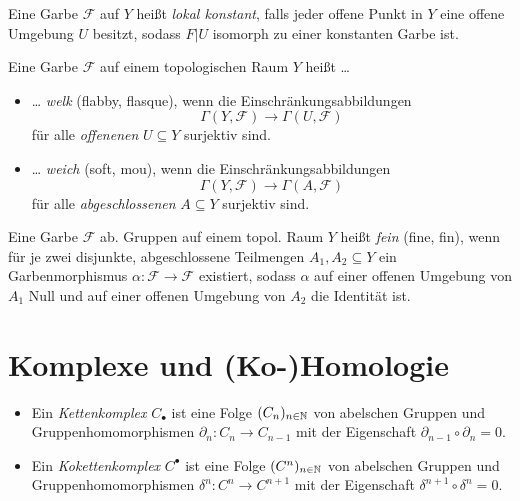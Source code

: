 \documentclass{cheat-sheet}
\newcommand{\CC}[1]{{#1}_{\bullet}} %
\newcommand{\CCC}[1]{{#1}^{\bullet}} %
\newcommand{\Fais}{\mathcal{F}} %
\begin{document}
\begin{samepage}

\begin{defn}
  Eine Garbe $\Fais$ auf $Y$ heißt \emph{lokal konstant}, falls jeder offene Punkt in $Y$ eine offene Umgebung $U$ besitzt, sodass $F|U$ isomorph zu einer konstanten Garbe ist.
\end{defn}

\begin{defn}
   Eine Garbe $\Fais$ auf einem topologischen Raum $Y$ heißt \ldots{}
  \begin{itemize}
    \item \ldots{} \emph{welk} (flabby, flasque), wenn die Einschränkungsabbildungen
    \[ \Gamma(Y, \Fais) \to \Gamma(U, \Fais) \]
    für alle {\em offenenen} $U \subseteq Y$ surjektiv sind.
    \item \ldots{} \emph{weich} (soft, mou), wenn die Einschränkungsabbildungen
    \[ \Gamma(Y, \Fais) \to \Gamma(A, \Fais) \]
    für alle {\em abgeschlossenen} $A \subseteq Y$ surjektiv sind.
  \end{itemize}
\end{defn}

\begin{defn}
   Eine Garbe $\Fais$ ab. Gruppen auf einem topol. Raum $Y$ heißt \emph{fein} (fine, fin), wenn für je zwei disjunkte, abgeschlossene Teilmengen $A_1, A_2 \subseteq Y$ ein Garbenmorphismus $\alpha : \Fais \to \Fais$ existiert, sodass $\alpha$ auf einer offenen Umgebung von $A_1$ Null und auf einer offenen Umgebung von $A_2$ die Identität ist.
\end{defn}

\section{Komplexe und (Ko-)Homologie}

\end{samepage}


\begin{defn}
  \begin{itemize}
    \item Ein \emph{Kettenkomplex} $\CC{C}$ ist eine Folge $(C_n)_{n \in \mathbb{N}}$ von abelschen Gruppen und Gruppenhomomorphismen $\partial_n : C_n \to C_{n-1}$ mit der Eigenschaft $\partial_{n-1} \circ \partial_n = 0$.
    \item Ein \emph{Kokettenkomplex} $\CCC{C}$ ist eine Folge $(C^n)_{n \in \mathbb{N}}$ von abelschen Gruppen und Gruppenhomomorphismen $\delta^n : C^n \to C^{n+1}$ mit der Eigenschaft $\delta^{n+1} \circ \delta^n = 0$.
  \end{itemize}
\end{defn}
\end{document}
